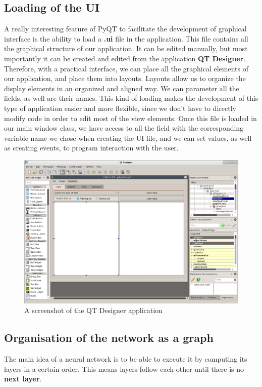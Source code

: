 \subsection{Loading of the UI}
A really interesting feature of PyQT to facilitate the development of graphical interface is the ability to load a \textbf{.ui} file in the application. This file contains all the graphical structure of our application. It can be edited manually, but most importantly it can be created and edited from the application \textbf{QT Designer}. Therefore, with a practical interface, we can place all the graphical elements of our application, and place them into layouts. Layouts allow us to organize the display elements in an organized and aligned way. We can parameter all the fields, as well are their names. This kind of loading makes the development of this type of application easier and more flexible, since we don't have to directly modify code in order to edit most of the view elements.
\newline Once this file is loaded in our main window class, we have access to all the field with the corresponding variable name we chose when creating the UI file, and we can set values, as well as creating events, to program interaction with the user.
\begin{figure}[!h]
    \centering 
    \includegraphics[scale=0.35]{figures/qt_designer.png}
    \caption{A screenshot of the QT Designer application}
\end{figure}
\subsection{Organisation of the network as a graph}
The main idea of a neural network is to be able to execute it by computing its layers in a certain order. This means layers follow each other until there is no \textbf{next layer}.
